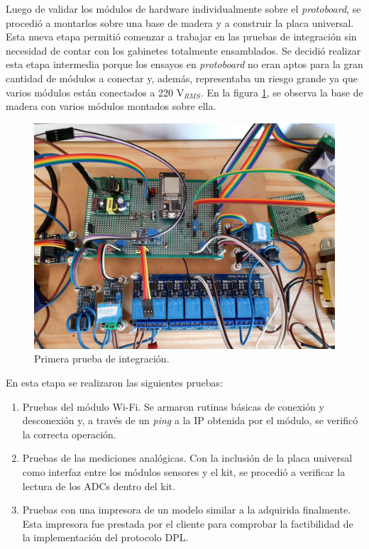 Luego de validar los módulos de hardware individualmente sobre el \textit{protoboard}, se procedió a montarlos sobre una base de madera y a construir la placa universal. Esta nueva etapa permitió comenzar a trabajar en las pruebas de integración sin necesidad de contar con los gabinetes totalmente ensamblados. Se decidió realizar esta etapa intermedia porque los ensayos en \textit{protoboard} no eran aptos para la gran cantidad de módulos a conectar y, además, representaba un riesgo grande ya que varios módulos están conectados a 220 V$_{RMS}$. En la figura \ref{fig:BaseMadera}, se observa la base de madera con varios módulos montados sobre ella.

\begin{figure}[htpb]
	\centering
	\includegraphics[scale=0.09]{./Figures/madera.jpg}
	\caption{Primera prueba de integración.}
	\label{fig:BaseMadera}
\end{figure}

En esta etapa se realizaron las siguientes pruebas:
\begin{enumerate}
	\item Pruebas del módulo Wi-Fi. Se armaron rutinas básicas de conexión y desconexión y, a través de un \textit{ping} a la IP obtenida por el módulo, se verificó la correcta operación.
	\item Pruebas de las mediciones analógicas. Con la inclusión de la placa universal como interfaz entre los módulos sensores y el kit, se procedió a verificar la lectura de los ADCs dentro del kit.
	\item Pruebas con una impresora de un modelo similar a la adquirida finalmente. Esta impresora fue prestada por el cliente para comprobar la factibilidad de la implementación del protocolo DPL.
\end{enumerate}

